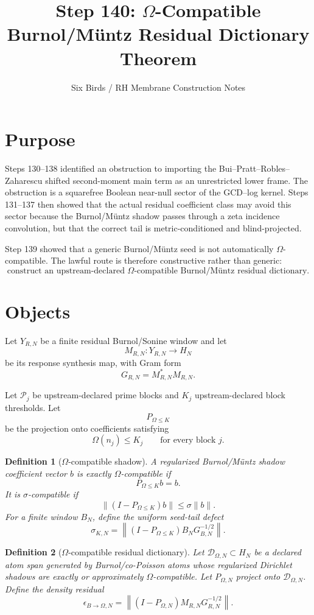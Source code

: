\documentclass[11pt]{article}
\title{Step 140: $\Omega$-Compatible Burnol/M\"untz Residual Dictionary Theorem}
\author{Six Birds / RH Membrane Construction Notes}
\date{}
\newtheorem{definition}{Definition}
\begin{document}
\maketitle

\section{Purpose}

Steps 130--138 identified an obstruction to importing the Bui--Pratt--Robles--Zaharescu shifted second-moment main term as an unrestricted lower frame.  The obstruction is a squarefree Boolean near-null sector of the GCD--log kernel.  Steps 131--137 then showed that the actual residual coefficient class may avoid this sector because the Burnol/M\"untz shadow passes through a zeta incidence convolution, but that the correct tail is metric-conditioned and blind-projected.

Step 139 showed that a generic Burnol/M\"untz seed is not automatically $\Omega$-compatible.  The lawful route is therefore constructive rather than generic:
\[
\boxed{\text{construct an upstream-declared $\Omega$-compatible Burnol/M\"untz residual dictionary.}}
\]

\section{Objects}

Let $Y_{R,N}$ be a finite residual Burnol/Sonine window and let
\[
M_{R,N}:Y_{R,N}\to H_N
\]
be its response synthesis map, with Gram form
\[
G_{R,N}=M_{R,N}^*M_{R,N}.
\]

Let $\mathcal P_j$ be upstream-declared prime blocks and $K_j$ upstream-declared block thresholds.  Let
\[
P_{\Omega\le K}
\]
be the projection onto coefficients satisfying
\[
\Omega(n_j)\le K_j\qquad \text{for every block }j.
\]

\begin{definition}[$\Omega$-compatible shadow]
A regularized Burnol/M\"untz shadow coefficient vector $b$ is exactly $\Omega$-compatible if
\[
P_{\Omega\le K}b=b.
\]
It is $\sigma$-compatible if
\[
\|(I-P_{\Omega\le K})b\|\le \sigma\|b\|.
\]
For a finite window $B_N$, define the uniform seed-tail defect
\[
\sigma_{K,N}=\left\|(I-P_{\Omega\le K})B_NG_{B,N}^{-1/2}\right\|.
\]
\end{definition}

\begin{definition}[$\Omega$-compatible residual dictionary]
Let $\mathcal D_{\Omega,N}\subset H_N$ be a declared atom span generated by Burnol/co-Poisson atoms whose regularized Dirichlet shadows are exactly or approximately $\Omega$-compatible.  Let $P_{\Omega,N}$ project onto $\mathcal D_{\Omega,N}$.  Define the density residual
\[
\epsilon_{B\to\Omega,N}
=
\left\|(I-P_{\Omega,N})M_{R,N}G_{R,N}^{-1/2}\right\|.
\]
\end{definition}
\end{document}
